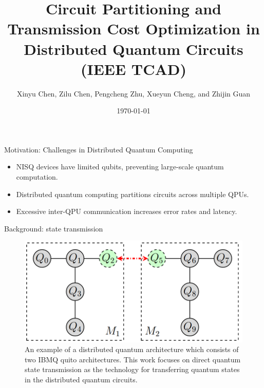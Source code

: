 \documentclass{beamer}
\title{Circuit Partitioning and Transmission Cost Optimization in Distributed Quantum Circuits (IEEE TCAD)}
\author{Xinyu Chen, Zilu Chen, Pengcheng Zhu, Xueyun Cheng, and Zhijin Guan}
\date{\today}
\institute{Nantong University}
\begin{document}
	
	\begin{frame}
		\titlepage
	\end{frame}
	
	\begin{frame}{Motivation: Challenges in Distributed Quantum Computing}
		\begin{itemize}
			\item NISQ devices have limited qubits, preventing large-scale quantum computation.
			\item Distributed quantum computing partitions circuits across multiple QPUs.
			\item Excessive inter-QPU communication increases error rates and latency.
		\end{itemize}
	\end{frame}
	

	\begin{frame}{Background: state transmission}
		\begin{figure}
			\includegraphics[width=.8\textheight]{figure/back.png}
			\caption[]{An example of a distributed quantum architecture which consists of two IBMQ quito architectures. This work focuses on direct quantum state transmission as the technology for transferring quantum states in the distributed quantum circuits.}
		\end{figure}
	\end{frame}
	
\end{document}
